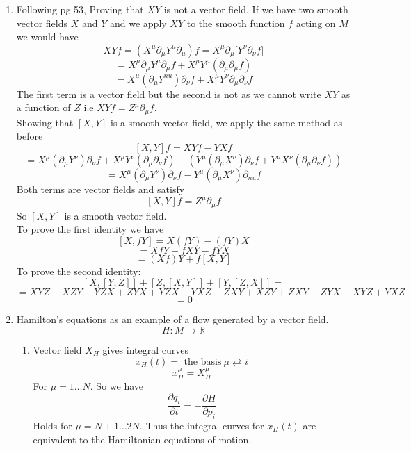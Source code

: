 \documentclass[12pt]{article}
\begin{document}
\begin{enumerate}
    \item Following pg 53, Proving that $XY$ is not a vector field. If we have two smooth vector fields $X$ and $Y$ and we apply $XY$ to the smooth function $f$ acting on $M$ we would have 
    $$ XYf = ( X^{\mu} \partial_{\mu} Y^{\mu} \partial_{\mu} ) f= X^{\mu} \partial_{\mu} \Big[ Y^{\nu} \partial_{\nu} f \Big] $$
    $$ = X^{\mu} \partial_{\mu}  Y^{\mu} \partial_{\mu} f + X^{\mu} Y^{\mu} ( \partial_{\mu} \partial_{\mu} f) $$
    $$ = X^{\mu} ( \partial_{\mu} Y^{nu} ) \partial_{\nu} f + X^{\mu} Y^{\nu} \partial_{\mu} \partial_{\nu} f $$
    The first term is a vector field but the second is not as we cannot write $XY$ as a function of $Z$ i.e $XYf = Z^{\mu} \partial_{\mu} f $.
    \\
    Showing that $[X,Y]$ is a smooth vector field, we apply the same method as before 
    $$ [X,Y]f = XYf - YXf $$
    $$ = X^{\mu} (\partial_{\mu} Y^{\nu} ) \partial_{\nu} f + X^{\mu} Y^{\nu} ( \partial_{\mu} \partial_{\nu} f) -  (Y^{\mu} ( \partial_{\mu} X^{\nu} ) \partial_{\nu} f + Y^{\mu} X^{\nu} ( \partial_{\mu} \partial_{\nu} f)) $$
    $$ = X^{\mu} ( \partial_{\mu} Y^{\nu} ) \partial_{\nu} f - Y^{\mu} ( \partial_{\mu} X^{\nu} ) \partial_{nu} f $$
    Both terms are vector fields and satisfy 
    $$ [X,Y]f = Z^{\mu} \partial_{\mu} f $$
    So $[X,Y]$ is a smooth vector field. 
    \\
    To prove the first identity we have 
    $$ [X,fY] = X(fY) - (fY)X $$
    $$ = XfY + fXY - fYX $$
    $$ = (Xf)Y + f[X,Y] $$
    To prove the second identity:
    $$ [X,[Y,Z]] + [Z,[X,Y]] + [Y, [Z,X]] = $$
    $$ = XYZ - XZY - YZX + ZYX + YZX - YXZ - ZXY+ XZY + ZXY - ZYX - XYZ + YXZ $$
    $$ = 0 $$
    
    \item Hamilton's equations as an example of a flow generated by a vector field. 
    $$ H: M \rightarrow \mathbb{R} $$
    \begin{enumerate}
        \item Vector field $X_H$ gives integral curves 
        $$ x_H (t) = \textrm{ the basis}\ \mu \rightleftarrows i $$
        $$ \dot{x}_H^{\mu} = X^{\mu}_H$$
        For $\mu = 1 \ldots N$. So we have 
        $$ \frac{\partial q_i}{\partial t} = -\frac{\partial H}{\partial p_i} $$
        Holds for $\mu = N+1 \ldots 2N$. Thus the integral curves for $x_H (t) $ are equivalent to the Hamiltonian equations of motion. 


\end{enumerate}
\end{enumerate}
\end{document}
